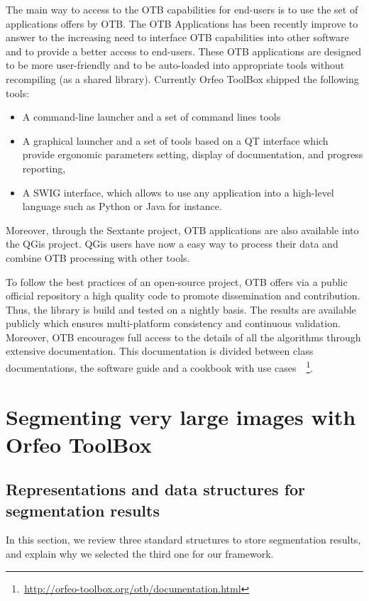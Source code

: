 \documentclass{josis}
\newcommand{\furl}[1]{    $\,$\footnote{$\,$\url{#1}}}
\begin{document}
The main way to access to the OTB capabilities for end-users is to use the set of applications offers by OTB. The OTB Applications has been recently improve to answer to the increasing need to interface OTB capabilities into other software and to provide a better access to end-users. These OTB applications are designed to be more user-friendly and to be auto-loaded into appropriate tools without recompiling (as a shared library). Currently Orfeo ToolBox shipped the following tools:
\begin{itemize}
\item A command-line launcher and a set of command lines tools
\item A graphical launcher and a set of tools based on a QT interface which provide ergonomic parameters setting, display of documentation, and progress reporting,
\item A SWIG interface, which allows to use any application into a high-level language such as Python or Java for instance.
\end{itemize}
Moreover, through the Sextante project, OTB applications are also available into the QGis project. QGis users have now a easy way to process their data and combine OTB processing with other tools.  

To follow the best practices of an open-source project, OTB offers via a public official repository a high quality code to promote dissemination and contribution. Thus, the library is build and tested on a nightly basis. The results are available publicly which ensures multi-platform consistency and continuous validation. Moreover, OTB encourages full access to the details of all the algorithms through extensive documentation. This documentation is divided between class documentations, the software guide and a cookbook with use cases~\furl{http://orfeo-toolbox.org/otb/documentation.html}.

\section{Segmenting very large images with Orfeo ToolBox}


\subsection{Representations and data structures for segmentation results}

In this section, we review three standard structures to store
segmentation results, and explain why we selected the third one for
our framework.
\end{document}
